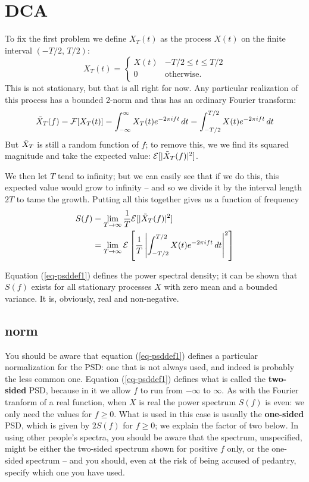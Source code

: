 \documentclass[12pt]{article}\usepackage{graphicx, color}
\begin{document}
\section{DCA}
To fix the first problem we define $X_T (t)$ as the process 
$X (t)$ on the finite interval $(-T/2, \,T/2)$:
%
\[
X_T (t) = \left \{
\begin{array}{cc}
X(t) & -T/2 \le t \le T/2\\
0 & \mathrm{ otherwise.} \\
\end{array}
\right .
\]
%
This is not stationary, but that is all right for now.
Any particular realization of this process
has a bounded 2-norm and thus has an ordinary Fourier transform:
%
\[
\tilde{X}_T (f) = \mathcal{F} [ X_T (t)] = 
\int_{- \infty} ^{\infty} X_T (t) e^{-2 \pi i ft} \, dt = 
\int_{-T/2}^{T/2}  X (t) e^{-2 \pi i ft} \, dt
\]
%
But $\tilde{X}_T$ is still a random function of $f$;
to remove this,
we we find its squared magnitude and take the expected value:
$\mathcal{E} [ | \tilde{X}_T (f) | ^ 2 ]$.

We then let $T$ tend to infinity;
but we can easily see that if we do this,
this expected value would grow to infinity -- and
so we divide it by the interval length $2T$ to tame the growth.
Putting all this together gives us a function of frequency
%
\begin{equation}
\label{eq-psddef1}
\begin{split}
S(f) & = \lim_{T \to \infty} \frac{1}{T}
\mathcal{E} [ | \tilde{X}_T (f) | ^ 2 ] \\
& = \lim_{T \to \infty} \mathcal{E} \left [ \frac{1}{T} \left | 
\int_{-T/2}^{T/2}  X (t) e^{-2 \pi i ft} \, dt \right | ^ 2 \right ]
\end{split}
\end{equation}

Equation (\ref{eq-psddef1}) defines the power spectral density;
\label{sy-psd}
it can be shown that $S(f)$ exists for all
stationary processes $X$ with zero mean and a bounded variance.
It is, obviously, real and non-negative.

\subsection{norm}
You should be aware that equation (\ref{eq-psddef1}) defines
a particular normalization for the PSD: one that is not always used,
and indeed is probably the less common one.
Equation (\ref{eq-psddef1}) defines what is called
the \textbf{two-sided} PSD,
because in it we allow $f$ to run from $-\infty$ to $\infty$.
As with the Fourier tranform of a real function,
when $X$ is real the power spectrum $S(f)$ is even:
we only need the values for $f \ge 0$.
What is used in this case is usually the
\textbf{one-sided} PSD,
which is given by $2 S(f)$ for $f \ge 0$;
we explain the factor of two below.
In using other people's spectra,
you should be aware that the spectrum,
unspecified, might be either the two-sided spectrum
shown for positive $f$ only, or the one-sided spectrum -- and
you should,
even at the risk of being accused of pedantry,
specify which one you have used.
\end{document}
